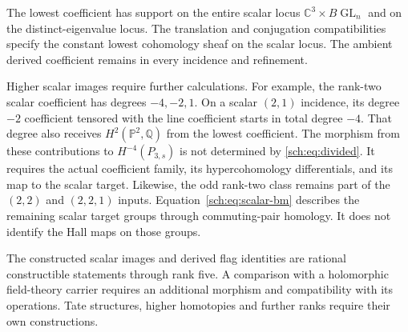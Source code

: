 The lowest coefficient has support on the entire scalar locus
$\mathbb C^3\times B\operatorname{GL}_n$ and on the distinct-eigenvalue
locus. The translation and conjugation compatibilities specify the
constant lowest cohomology sheaf on the scalar locus. The ambient
derived coefficient remains in every incidence and refinement.

Higher scalar images require further calculations. For example, the
rank-two scalar coefficient has degrees $-4,-2,1$. On a scalar
$(2,1)$ incidence, its degree $-2$ coefficient tensored with the
line coefficient starts in total degree $-4$.
That degree also receives $H^2(\mathbb P^2,\mathbb Q)$ from the
lowest coefficient. The morphism from these contributions to
$H^{-4}(P_{3,s})$ is not determined by
\eqref{sch:eq:divided}. It requires the actual coefficient family,
its hypercohomology differentials, and its map to the scalar target.
Likewise, the odd rank-two class remains part of the $(2,2)$ and
$(2,2,1)$ inputs. Equation~\eqref{sch:eq:scalar-bm} describes the
remaining scalar target groups through commuting-pair homology.
It does not identify the Hall maps on those groups.

The constructed scalar images and derived flag identities are rational
constructible statements through rank five. A comparison with a
holomorphic field-theory carrier requires an additional morphism and
compatibility with its operations. Tate structures, higher homotopies
and further ranks require their own constructions.
